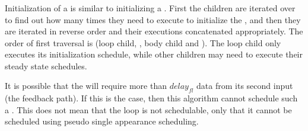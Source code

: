 \subsubsection{{\feedbackloops}}
\label{sec:sas-fl}

 Initialization of a
{\feedbackloop} is similar to initializing a {\pipeline}. First
the children are iterated over to find out how many times they
need to execute to initialize the {\feedbackloop}, and then they
are iterated in reverse order and their executions concatenated
appropriately. The order of first traversal is (loop child,
{\splitter}, body child and {\joiner}). The loop child only
executes its initialization schedule, while other children may
need to execute their steady state schedules.

It is possible that the {\joiner} will require more than
$delay_{fl}$ data from its second input (the feedback path). If
this is the case, then this algorithm cannot schedule such a
{\feedbackloop}. This does not mean that the loop is not
schedulable, only that it cannot be scheduled using pseudo single
appearance scheduling.


